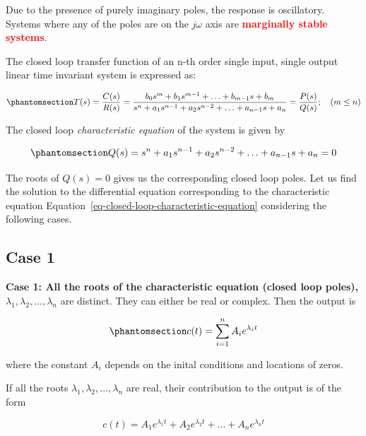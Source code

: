 \documentclass[
  14pt,
  a4paper,
  oneside,
  open=any,
  a4paper,
  14pt]{report}
\begin{document}
Due to the presence of purely imaginary poles, the response is
oscillatory. Systems where any of the poles are on the \(j\omega\) axis
are \textcolor{red}{\textbf{marginally stable systems}}.

The closed loop transfer function of an n-th order single input, single
output linear time invariant system is expressed as:

\begin{equation}\phantomsection\label{eq-closed-loop-transfer-function}{
    T(s) = \dfrac{C(s)}{R(s)} = \dfrac{b_0 s^m + b_1 s^{m-1} + \ldots + b_{m-1}s + b_m}{s^n + a_1 s^{n-1} + a_2 s^{n-2} + \ldots + a_{n-1}s + a_n} = \dfrac{P(s)}{Q(s)}; \quad (m \leq n) 
}\end{equation}

The closed loop \emph{characteristic equation} of the system is given by

\begin{equation}\phantomsection\label{eq-closed-loop-characteristic-equation}{
    Q(s) = s^n + a_1 s^{n-1} + a_2 s^{n-2} + \ldots + a_{n-1}s + a_n = 0
}\end{equation}

The roots of \(Q(s) = 0\) gives us the corresponding closed loop poles.
Let us find the solution to the differential equation corresponding to
the characteristic equation
Equation~\ref{eq-closed-loop-characteristic-equation} considering the
following cases.

\subsection{Case 1}\label{case-1}

\textbf{Case 1: All the roots of the characteristic equation (closed
loop poles),} \(\lambda_1, \lambda_2, \ldots, \lambda_n\) are distinct.
They can either be real or complex. Then the output is

\begin{equation}\phantomsection\label{eq-characteristic-equation-case1}{
    c(t) = \sum\limits_{i=1}^{n} A_i e^{\lambda_i t}
}\end{equation}

where the constant \(A_i\) depends on the inital conditions and
locations of zeros.

If all the roots \(\lambda_1, \lambda_2, \ldots, \lambda_n\) are real,
their contribution to the output is of the form

\[
    c(t) = A_1 e^{\lambda_1 t} + A_2 e^{\lambda_2 t} + \ldots + A_n e^{\lambda_n t}
\]
\end{document}
